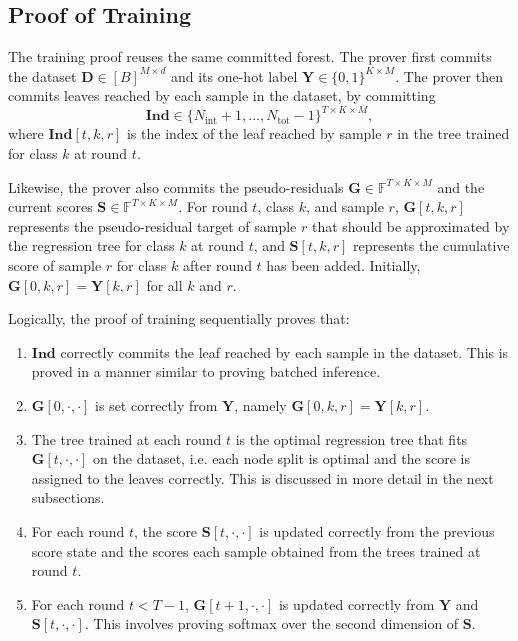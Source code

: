 \subsection{Proof of Training}

The training proof reuses the same committed forest. 
The prover first commits the dataset $\mathbf{D}\in [B]^{M\times d}$ and 
its one-hot label $\mathbf{Y}\in \{0, 1\}^{K\times M}$.
The prover then commits leaves reached by each sample in the dataset,
by committing
\[
\mathbf{Ind} \in
\{N_{\mathrm{int}}+1,\ldots,N_{\mathrm{tot}}-1\}^{T\times K\times M},
\]
where $\mathbf{Ind}[t, k, r]$ 
is the index of the leaf reached by sample
$r$ in the tree trained for class $k$ at round $t$.

Likewise, the prover also commits the pseudo-residuals
$\mathbf{G}\in \mathbb{F}^{T\times K\times M}$ and the current scores
$\mathbf{S}\in \mathbb{F}^{T\times K\times M}$.
For round $t$, class $k$, and sample $r$,
$\mathbf{G}[t,k,r]$ represents the pseudo-residual target of sample $r$ that
should be approximated by the regression tree for class $k$ at round $t$, and
$\mathbf{S}[t,k,r]$ represents the cumulative score of sample $r$ for class
$k$ after round $t$ has been added.
Initially, $\mathbf{G}[0,k,r]=\mathbf{Y}[k,r]$ for all $k$ and $r$.

Logically, the proof of training sequentially proves that:
\begin{enumerate}
  \item $\mathbf{Ind}$ correctly commits the leaf reached by each sample in the dataset.
    This is proved in a manner similar to proving batched inference.
  \item $\mathbf{G}[0, \cdot, \cdot]$ is set correctly from $\mathbf{Y}$,
    namely $\mathbf{G}[0,k,r]=\mathbf{Y}[k,r]$.
  \item The tree trained at each round $t$ is the optimal regression tree that fits $\mathbf{G}[t, \cdot, \cdot]$ on the dataset,
    i.e. each node split is optimal and the score is assigned to the leaves correctly. This is discussed in more detail in the next subsections.
  \item For each round $t$, the score $\mathbf{S}[t, \cdot, \cdot]$ is updated correctly
    from the previous score state and the scores each sample obtained from the trees trained at round $t$.
  \item For each round $t<T-1$, $\mathbf{G}[t+1, \cdot, \cdot]$ is updated correctly from $\mathbf{Y}$ and $\mathbf{S}[t, \cdot, \cdot]$.
    This involves proving softmax over the second dimension of $\mathbf{S}$.
\end{enumerate}

